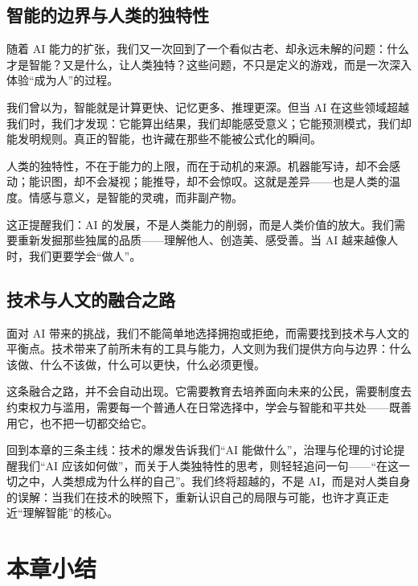 \subsection*{智能的边界与人类的独特性}

随着 AI 能力的扩张，我们又一次回到了一个看似古老、却永远未解的问题：什么才是智能？又是什么，让人类独特？这些问题，不只是定义的游戏，而是一次深入体验“成为人”的过程。

我们曾以为，智能就是计算更快、记忆更多、推理更深。但当 AI 在这些领域超越我们时，我们才发现：它能算出结果，我们却能感受意义；它能预测模式，我们却能发明规则。真正的智能，也许藏在那些不能被公式化的瞬间。

人类的独特性，不在于能力的上限，而在于动机的来源。机器能写诗，却不会感动；能识图，却不会凝视；能推导，却不会惊叹。这就是差异——也是人类的温度。情感与意义，是智能的灵魂，而非副产物。

这正提醒我们：AI 的发展，不是人类能力的削弱，而是人类价值的放大。我们需要重新发掘那些独属的品质——理解他人、创造美、感受善。当 AI 越来越像人时，我们更要学会“做人”。

\subsection*{技术与人文的融合之路}

面对 AI 带来的挑战，我们不能简单地选择拥抱或拒绝，而需要找到技术与人文的平衡点。技术带来了前所未有的工具与能力，人文则为我们提供方向与边界：什么该做、什么不该做，什么可以更快，什么必须更慢。

这条融合之路，并不会自动出现。它需要教育去培养面向未来的公民，需要制度去约束权力与滥用，需要每一个普通人在日常选择中，学会与智能和平共处——既善用它，也不把一切都交给它。

回到本章的三条主线：技术的爆发告诉我们“AI 能做什么”，治理与伦理的讨论提醒我们“AI 应该如何做”，而关于人类独特性的思考，则轻轻追问一句——“在这一切之中，人类想成为什么样的自己”。我们终将超越的，不是 AI，而是对人类自身的误解：当我们在技术的映照下，重新认识自己的局限与可能，也许才真正走近“理解智能”的核心。

\section{本章小结}
